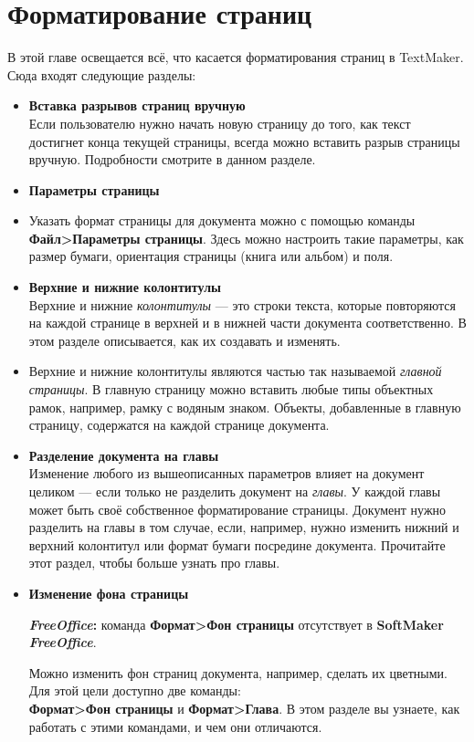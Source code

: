 \documentclass[a4paper,10pt]{article}
\begin{document}
\section{Форматирование страниц}
В этой главе освещается всё, что касается форматирования страниц в TextMaker. Сюда входят следующие разделы:
\begin{itemize}
 \item \textbf{Вставка разрывов страниц вручную}\\
 Если пользователю нужно начать новую страницу до того, как текст достигнет конца текущей страницы, всегда можно вставить разрыв страницы вручную. Подробности смотрите в данном разделе.
\item \textbf{Параметры страницы}\\
\item Указать формат страницы для документа можно с помощью команды \textbf{Файл>Параметры страницы}. Здесь можно настроить такие параметры, как размер бумаги, ориентация страницы (книга или альбом) и поля.
\item \textbf{Верхние и нижние колонтитулы}\\
Верхние и нижние \textit{колонтитулы} --- это строки текста, которые повторяются на каждой странице в верхней и в нижней части документа соответственно. В этом разделе описывается, как их создавать и изменять.
\item Верхние и нижние колонтитулы являются частью так называемой \textit{главной страницы}. В главную страницу можно вставить любые типы объектных рамок, например, рамку с водяным знаком. Объекты, добавленные в главную страницу, содержатся на каждой странице документа.
\item \textbf{Разделение документа на главы}\\
Изменение любого из вышеописанных параметров влияет на документ целиком --- если только не разделить документ на \textit{главы}. У каждой главы может быть своё собственное форматирование страницы. Документ нужно разделить на главы в том случае, если, например, нужно изменить нижний и верхний колонтитул или формат бумаги посредине документа. Прочитайте этот раздел, чтобы больше узнать про главы.
\item \textbf{Изменение фона страницы}
\begin{mdframed}[backgroundcolor=pink!50]
\textbf{\textit{FreeOffice}:} команда \textbf{Формат>Фон страницы} отсутствует в \textbf{SoftMaker \textit{FreeOffice}}.
\end{mdframed}
Можно изменить фон страниц документа, например, сделать их цветными. Для этой цели доступно две команды:\\
\textbf{Формат>Фон страницы} и \textbf{Формат>Глава}. В этом разделе вы узнаете, как работать с этими командами, и чем они отличаются.
\end{itemize}
\end{document}
